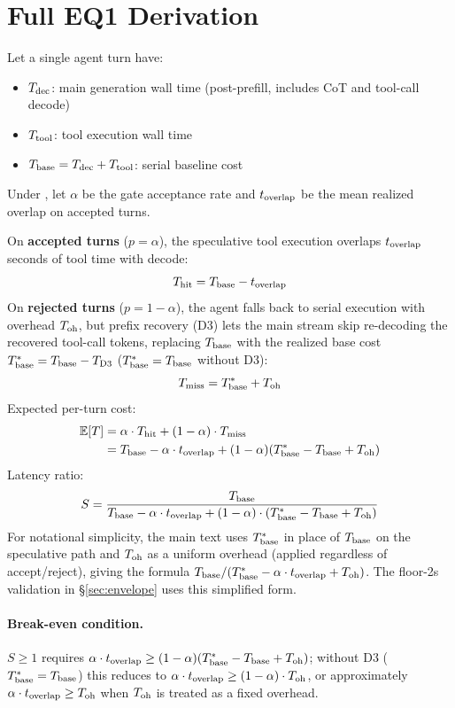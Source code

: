 \section{Full EQ1 Derivation}
\label{app:eq1}

Let a single agent turn have:
\begin{itemize}
  \item $T_{\mathrm{dec}}$: main generation wall time (post-prefill, includes CoT and tool-call decode)
  \item $T_{\mathrm{tool}}$: tool execution wall time
  \item $T_{\mathrm{base}} = T_{\mathrm{dec}} + T_{\mathrm{tool}}$: serial baseline cost
\end{itemize}
Under \spork{}, let $\alpha$ be the gate acceptance rate and $t_{\mathrm{overlap}}$ be the mean realized overlap on accepted turns.

On \textbf{accepted turns} ($p = \alpha$), the speculative tool execution overlaps $t_{\mathrm{overlap}}$ seconds of tool time with decode:
\[
  T_{\mathrm{hit}} = T_{\mathrm{base}} - t_{\mathrm{overlap}}
\]
On \textbf{rejected turns} ($p = 1 - \alpha$), the agent falls back to serial execution with overhead $T_{\mathrm{oh}}$, but prefix recovery (D3) lets the main stream skip re-decoding the recovered tool-call tokens, replacing $T_{\mathrm{base}}$ with the realized base cost $T_{\mathrm{base}}^{*} = T_{\mathrm{base}} - T_{\mathrm{D3}}$ ($T_{\mathrm{base}}^{*} = T_{\mathrm{base}}$ without D3):
\[
  T_{\mathrm{miss}} = T_{\mathrm{base}}^{*} + T_{\mathrm{oh}}
\]
Expected per-turn cost:
\[
  \begin{aligned}
  \mathbb{E}[T] &= \alpha \cdot T_{\mathrm{hit}} + (1-\alpha) \cdot T_{\mathrm{miss}} \\
                &= T_{\mathrm{base}} - \alpha \cdot t_{\mathrm{overlap}} + (1-\alpha)(T_{\mathrm{base}}^{*} - T_{\mathrm{base}} + T_{\mathrm{oh}})
  \end{aligned}
\]
Latency ratio:
\[
  S = \frac{T_{\mathrm{base}}}{T_{\mathrm{base}} - \alpha \cdot t_{\mathrm{overlap}} + (1-\alpha) \cdot (T_{\mathrm{base}}^{*} - T_{\mathrm{base}} + T_{\mathrm{oh}})}
\]
For notational simplicity, the main text uses $T_{\mathrm{base}}^{*}$ in place of $T_{\mathrm{base}}$ on the speculative path and $T_{\mathrm{oh}}$ as a uniform overhead (applied regardless of accept/reject), giving the formula $T_{\mathrm{base}} / (T_{\mathrm{base}}^{*} - \alpha \cdot t_{\mathrm{overlap}} + T_{\mathrm{oh}})$.
The floor-2s validation in \S\ref{sec:envelope} uses this simplified form.

\paragraph{Break-even condition.}
$S \geq 1$ requires $\alpha \cdot t_{\mathrm{overlap}} \geq (1-\alpha)(T_{\mathrm{base}}^{*} - T_{\mathrm{base}} + T_{\mathrm{oh}})$; without D3 ($T_{\mathrm{base}}^{*} = T_{\mathrm{base}}$) this reduces to $\alpha \cdot t_{\mathrm{overlap}} \geq (1-\alpha) \cdot T_{\mathrm{oh}}$, or approximately $\alpha \cdot t_{\mathrm{overlap}} \geq T_{\mathrm{oh}}$ when $T_{\mathrm{oh}}$ is treated as a fixed overhead.

